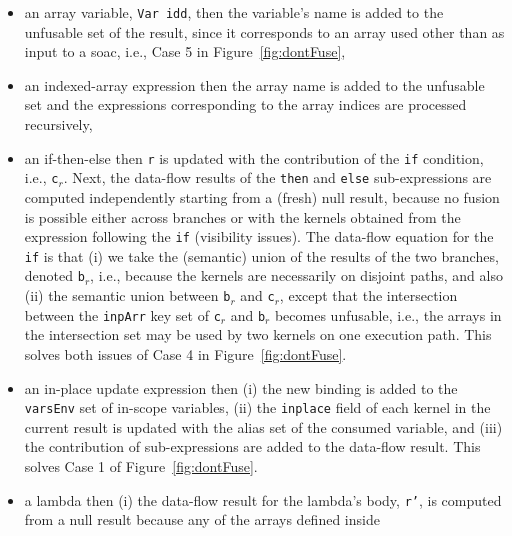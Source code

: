 \documentclass{sigplanconf}  %
\newcommand{\emp}[1]{\textcolor{DikuRed}{ #1}}
\begin{document}
\begin{itemize}
    \item an array variable, {\tt Var idd}, then the variable's 
            name is added to the unfusable set of the result,
            since it corresponds to an array used other than as 
            input to a {\sc soac}, i.e., \emp{Case 5} in Figure~\ref{fig:dontFuse},
    \item  an indexed-array expression then the array name is added to the 
            unfusable set and the expressions corresponding to the array indices
                are processed recursively,
    \item  an if-then-else then {\tt r} is updated with the contribution
            of the {\tt if} condition, i.e., {\tt c$_r$}. Next, the data-flow results of
            the {\tt then} and {\tt else} sub-expressions are computed independently 
            starting from a (fresh) null result, because no fusion is 
            possible either across branches or with the kernels obtained from the
            expression following the {\tt if} (visibility issues). 
            The data-flow equation for the {\tt if} is that (i) we take the (semantic) 
                union of the results of the two branches, denoted {\tt b$_r$}, i.e., because 
                the kernels are necessarily on disjoint paths, and also (ii)
                the semantic union between {\tt b$_r$} and {\tt c$_r$}, except that 
                the intersection between the {\tt inpArr} key set of {\tt c$_r$} and 
                {\tt b$_r$} becomes unfusable, i.e., the arrays in the intersection set
                may be used by two kernels on one execution path. 
            This solves both issues of \emp{Case 4} in Figure~\ref{fig:dontFuse}.
    \item an in-place update expression then (i) the new binding is added to the
            {\tt varsEnv} set of in-scope variables, (ii) the {\tt inplace}
            field of each kernel in the current result is updated with the
            alias set of the consumed variable, and (iii) the contribution of
            sub-expressions are added to the data-flow result. This solves
                \emp{Case 1} of Figure~\ref{fig:dontFuse}.
    \item a lambda then (i) the data-flow result for the lambda's body, {\tt r'},
                is computed from a null result because any of the arrays defined inside

\end{itemize}
\end{document}
